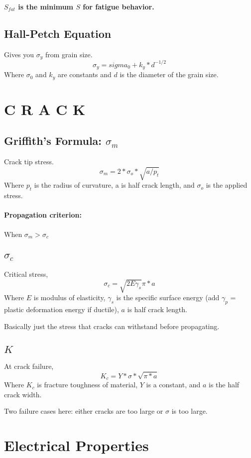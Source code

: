 \documentclass[a4paper,12pt]{report}
\begin{document}
\textbf{$S_{fat}$ is the minimum $S$ for fatigue behavior.}


\subsection{Hall-Petch Equation}
Gives you $\sigma_y$ from grain size.
$$\sigma_y = sigma_0 + k_y * d^{-1/2}$$
Where $\sigma_0$ and $k_y$ are constants and $d$ is the diameter of the grain size.





\section{C R A C K}
\subsection{Griffith's Formula: $\sigma_m$}
Crack tip stress. $$\sigma_m = 2*\sigma_o*\sqrt{a/p_t}$$
Where $p_t$ is the radius of curvature, a is half crack length, and $\sigma_o$ is the applied stress.

\paragraph{Propagation criterion: } When $\sigma_m > \sigma_c$

\subsection{$\sigma_c$}
Critical stress, $$\sigma_c = \sqrt{2E\gamma_s}{\pi*a}$$ Where $E$ is modulus of elasticity, $\gamma_s$ is the specific surface energy (add $\gamma_p$ = plastic deformation energy if ductile), $a$ is half crack length.

Basically just the stress that cracks can withstand before propagating. 

\subsection{$K$}
At crack failure, $$K_c = Y*\sigma*\sqrt{\pi*a}$$ Where $K_c$ is fracture toughness of material, $Y$ is a constant, and $a$ is the half crack width.

Two failure cases here: either cracks are too large or $\sigma$ is too large.

\section{Electrical Properties}
\end{document}
